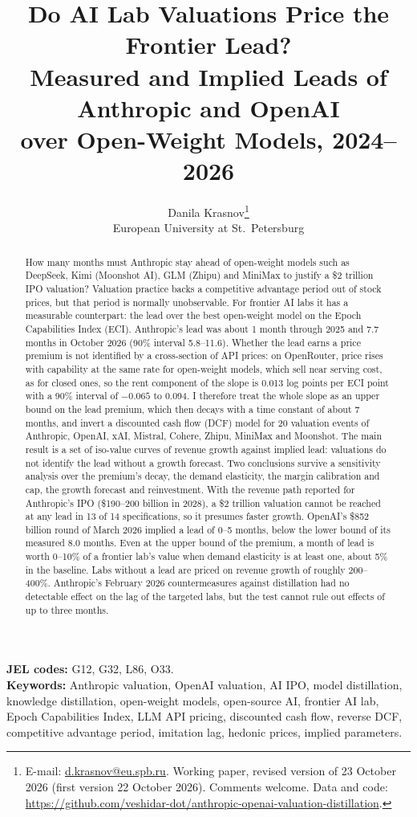 \documentclass[12pt]{article}
\title{\vspace{-3em}\Large Do AI Lab Valuations Price the Frontier Lead?\\ Measured and Implied Leads of Anthropic and OpenAI\\ over Open-Weight Models, 2024--2026}
\author{Danila Krasnov\thanks{E-mail: \href{mailto:d.krasnov@eu.spb.ru}{d.krasnov@eu.spb.ru}. Working paper, revised version of 23 October 2026 (first version 22 October 2026). Comments welcome. Data and code: \url{https://github.com/veshidar-dot/anthropic-openai-valuation-distillation}.}\\[0.3em]
\normalsize European University at St.~Petersburg}
\date{\vspace{-1.5em}}
\begin{document}
\maketitle

\begin{singlespace}
\begin{abstract}
\noindent How many months must Anthropic stay ahead of open-weight models such as DeepSeek, Kimi (Moonshot AI), GLM (Zhipu) and MiniMax to justify a \$2 trillion IPO valuation? Valuation practice backs a competitive advantage period out of stock prices, but that period is normally unobservable. For frontier AI labs it has a measurable counterpart: the lead over the best open-weight model on the Epoch Capabilities Index (ECI). Anthropic's lead was about 1 month through 2025 and 7.7 months in October 2026 (90\% interval 5.8--11.6). Whether the lead earns a price premium is not identified by a cross-section of API prices: on OpenRouter, price rises with capability at the same rate for open-weight models, which sell near serving cost, as for closed ones, so the rent component of the slope is 0.013 log points per ECI point with a 90\% interval of $-0.065$ to 0.094. I therefore treat the whole slope as an upper bound on the lead premium, which then decays with a time constant of about 7 months, and invert a discounted cash flow (DCF) model for 20 valuation events of Anthropic, OpenAI, xAI, Mistral, Cohere, Zhipu, MiniMax and Moonshot. The main result is a set of iso-value curves of revenue growth against implied lead: valuations do not identify the lead without a growth forecast. Two conclusions survive a sensitivity analysis over the premium's decay, the demand elasticity, the margin calibration and cap, the growth forecast and reinvestment. With the revenue path reported for Anthropic's IPO (\$190--200 billion in 2028), a \$2 trillion valuation cannot be reached at any lead in 13 of 14 specifications, so it presumes faster growth. OpenAI's \$852 billion round of March 2026 implied a lead of 0--5 months, below the lower bound of its measured 8.0 months. Even at the upper bound of the premium, a month of lead is worth 0--10\% of a frontier lab's value when demand elasticity is at least one, about 5\% in the baseline. Labs without a lead are priced on revenue growth of roughly 200--400\%. Anthropic's February 2026 countermeasures against distillation had no detectable effect on the lag of the targeted labs, but the test cannot rule out effects of up to three months.
\end{abstract}

\noindent\textbf{JEL codes:} G12, G32, L86, O33.\\
\textbf{Keywords:} Anthropic valuation, OpenAI valuation, AI IPO, model distillation, knowledge distillation, open-weight models, open-source AI, frontier AI lab, Epoch Capabilities Index, LLM API pricing, discounted cash flow, reverse DCF, competitive advantage period, imitation lag, hedonic prices, implied parameters.
\end{singlespace}
\end{document}
